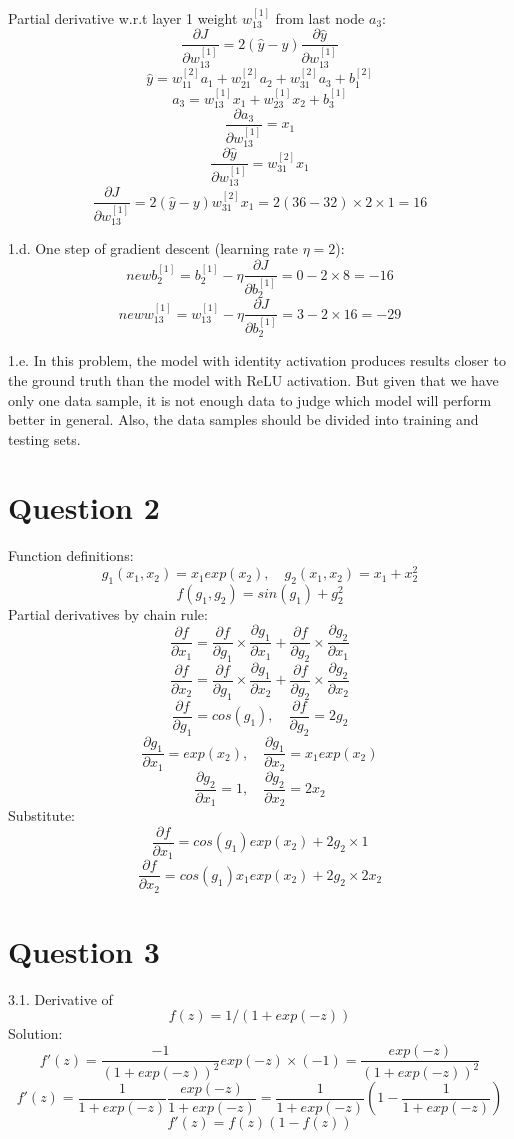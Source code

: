 \documentclass[10pt]{article}
\begin{document}
Partial derivative w.r.t layer 1 weight $w_13^{[1]}$ from last node $a_3$:
\[
	\frac{\partial J}{\partial w_{13}^{[1]}}=
	2(\hat{y}-y)\frac{\partial \hat{y}}{\partial w_13^{[1]}}
\]
\[
	\hat{y}=w_{11}^{[2]}a_1+w_{21}^{[2]}a_2+w_{31}^{[2]}a_3+b_1^{[2]}
\]
\[
	a_3=w_{13}^{[1]}x_1+w_{23}^{[1]}x_2+b_3^{[1]}
\]
\[
	\frac{\partial a_3}{\partial w_{13}^{[1]}}=x_1
\]
\[
	\frac{\partial \hat{y}}{\partial w_{13}^{[1]}}=w_{31}^{[2]}x_1
\]
\[
	\frac{\partial J}{\partial w_{13}^{[1]}}=
	2(\hat{y}-y)w_{31}^{[2]}x_1=2(36-32) \times 2 \times 1=16
\]

1.d. One step of gradient descent (learning rate $\eta=2$):
\[
	new b_2^{[1]}=b_2^{[1]}-\eta\frac{\partial J}{\partial b_2^{[1]}}=0-2 \times 8=-16
\]
\[
	new w_{13}^{[1]}=w_{13}^{[1]}-\eta\frac{\partial J}{\partial b_2^{[1]}}=3 - 2 \times 16=-29
\]

1.e. In this problem, the model with identity activation produces results closer to the ground truth than the model with ReLU activation. But given that we have only one data sample, it is not enough data to judge which model will perform better in general. Also, the data samples should be divided into training and testing sets.


\newpage
\section{Question 2}
Function definitions:
\[
	g_1(x_1, x_2)=x_1 exp(x_2),\quad g_2(x_1, x_2)=x_1+x_2^2
\]
\[
	f(g_1, g_2)=sin(g_1)+g_2^2
\]
Partial derivatives by chain rule:
\[
	\frac{\partial f}{\partial x_1}=
	\frac{\partial f}{\partial g_1}\times\frac{\partial g_1}{\partial x_1}+
	\frac{\partial f}{\partial g_2}\times\frac{\partial g_2}{\partial x_1}
\]
\[
	\frac{\partial f}{\partial x_2}=
	\frac{\partial f}{\partial g_1}\times\frac{\partial g_1}{\partial x_2}+
	\frac{\partial f}{\partial g_2}\times\frac{\partial g_2}{\partial x_2}
\]
\[
	\frac{\partial f}{\partial g_1}=cos(g_1),\quad
	\frac{\partial f}{\partial g_2}=2g_2
\]
\[
	\frac{\partial g_1}{\partial x_1}=exp(x_2),\quad
	\frac{\partial g_1}{\partial x_2}=x_1 exp(x_2)
\]
\[
	\frac{\partial g_2}{\partial x_1}=1,\quad
	\frac{\partial g_2}{\partial x_2}=2x_2
\]
Substitute:
\[
	\frac{\partial f}{\partial x_1}=cos(g_1)exp(x_2)+2g_2 \times 1
\]
\[
	\frac{\partial f}{\partial x_2}=cos(g_1) x_1 exp(x_2)+2g_2 \times 2x_2
\]


\newpage
\section{Question 3}
3.1. Derivative of
\[f(z)=1/(1+exp(-z))\]
Solution:
\[
	f'(z)=\frac{-1}{(1+exp(-z))^2}exp(-z)\times (-1)
	=\frac{exp(-z)}{(1+exp(-z))^2}
\]
\[
	f'(z)=\frac{1}{1+exp(-z)}\frac{exp(-z)}{1+exp(-z)}
	=\frac{1}{1+exp(-z)}\left(1-\frac{1}{1+exp(-z)}\right)
\]
\[
	f'(z)=f(z)(1-f(z))
\]
\end{document}
